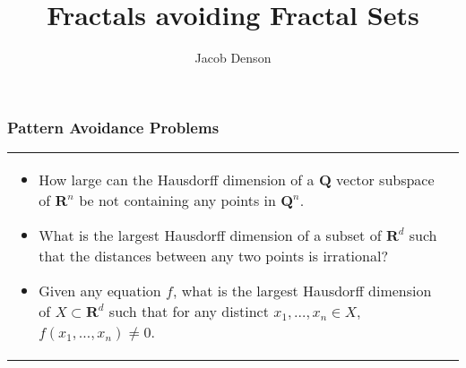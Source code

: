 \documentclass[usenames,dvipsnames]{beamer}
\title{Fractals avoiding Fractal Sets}
\author{Jacob Denson}
\institute{University of British Columbia}
\begin{document}
\maketitle

\begin{frame}
  \frametitle{Pattern Avoidance Problems}

\begin{tabular}{p{}p{}}

\begin{itemize}
    \item How large can the Hausdorff dimension of a $\mathbf{Q}$ vector subspace of $\mathbf{R}^n$ be not containing any points in $\mathbf{Q}^n$.

     \pause
     \item What is the largest Hausdorff dimension of a subset of $\mathbf{R}^d$ such that the distances between any two points is irrational?

     \pause
     \item Given any equation $f$, what is the largest Hausdorff dimension of $X \subset \mathbf{R}^d$ such that for any distinct $x_1, \dots, x_n \in X$, $f(x_1, \dots, x_n) \neq 0$. 
\end{itemize}

\end{tabular}

\end{frame}
\end{document}
